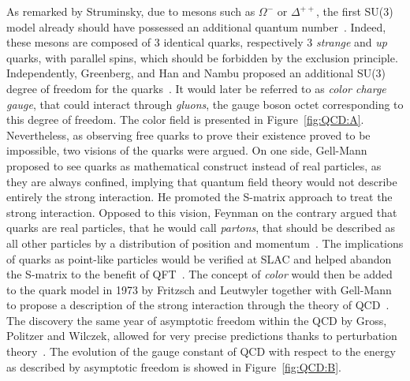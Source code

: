 	As remarked by Struminsky, due to mesons such as $\Omega^-$ or $\Delta^{++}$, the first SU(3) model already should have possessed an additional quantum number~\cite{STRUMINSKY1965}. Indeed, these mesons are composed of 3 identical quarks, respectively 3 \textit{strange} and \textit{up} quarks, with parallel spins, which should be forbidden by the exclusion principle. Independently, Greenberg, and Han and Nambu proposed an additional SU(3) degree of freedom for the quarks~\cite{GREENBERG1964,HANNAMBU1965}. It would later be referred to as \textit{color charge gauge}, that could interact through \textit{gluons}, the gauge boson octet corresponding to this degree of freedom. The color field is presented in Figure~\ref{fig:QCD:A}. Nevertheless, as observing free quarks to prove their existence proved to be impossible, two visions of the quarks were argued. On one side, Gell-Mann proposed to see quarks as mathematical construct instead of real particles, as they are always confined, implying that quantum field theory would not describe entirely the strong interaction. He promoted the S-matrix approach to treat the strong interaction. Opposed to this vision, Feynman on the contrary argued that quarks are real particles, that he would call \textit{partons}, that should be described as all other particles by a distribution of position and momentum~\cite{FEYNMAN1969}. The implications of quarks as point-like particles would be verified at SLAC and helped abandon the S-matrix to the benefit of QFT~\cite{BJORKEN1969}. The concept of \textit{color} would then be added to the quark model in 1973 by Fritzsch and Leutwyler together with Gell-Mann to propose a description of the strong interaction through the theory of \acf{QCD}~\cite{FRITZSCH1973}. The discovery the same year of asymptotic freedom within the QCD by Gross, Politzer and Wilczek, allowed for very precise predictions thanks to perturbation theory~\cite{GROSS1973,POLITZER1973}. The evolution of the gauge constant of QCD with respect to the energy as described by asymptotic freedom is showed in Figure~\ref{fig:QCD:B}.
	
